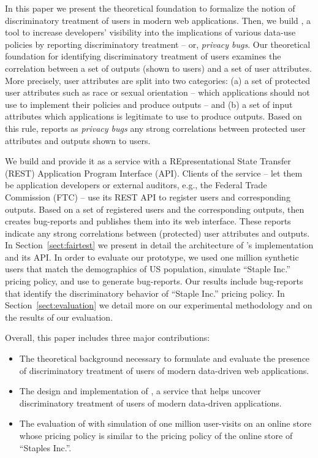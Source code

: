 In this paper we present the theoretical foundation to formalize the notion of
discriminatory treatment of users in modern web applications. Then, we build
\sysname, a tool to increase developers’ visibility into the implications of
various data-use policies by reporting discriminatory treatment -- or,
{\em privacy bugs}. Our theoretical foundation for identifying discriminatory
treatment of users examines the correlation between a set of outputs (shown to
users) and a set of user attributes. More precisely, user attributes are split
into two categories: (a) a set of protected user attributes such as race or
sexual orientation -- which applications should not use to implement their
policies and produce outputs -- and (b) a set of input attributes which
applications is legitimate to use to produce outputs. Based on this rule,
\sysname reports as {\em privacy bugs} any strong correlations between
protected user attributes and outputs shown to users.

We build \sysname and provide it as a service with a REpresentational
State Transfer (REST) Application Program Interface (API). Clients of the 
\sysname service -- let them be application developers or external auditors,
e.g., the Federal Trade Commission (FTC) -- use its REST API to register users
and corresponding outputs. Based on a set of registered users and the
corresponding outputs, \sysname then creates bug-reports and publishes them
into its web interface. These reports indicate any strong correlations between
(protected) user attributes and outputs. In Section~\ref{sect:fairtest} we
present in detail the architecture of \sysname's implementation and its API.
In order to evaluate our \sysname prototype, we used one million synthetic users
that match the demographics of US population, simulate ``Staple Inc.'' pricing
policy, and use \sysname to generate bug-reports. Our results include
bug-reports that identify the discriminatory behavior of ``Staple  Inc.''
pricing policy. In Section~\ref{sect:evaluation} we detail more on our
experimental methodology and on the results of our evaluation.

Overall, this paper includes three major contributions:
\begin{itemize}
  \item The theoretical background necessary to formulate and evaluate the
    presence of discriminatory treatment of users of modern data-driven web
    applications.
  \item The design and implementation of \sysname, a service that helps
    uncover discriminatory treatment of users of modern data-driven
    applications.
  \item The evaluation of \sysname with simulation of one million user-visits
    on an online store whose pricing policy is similar to
    the pricing policy of the online store of ``Staples Inc.''.
\end{itemize}

